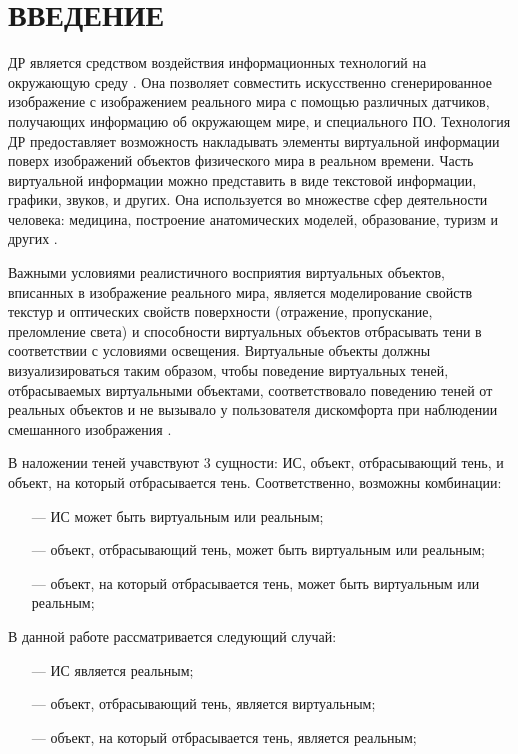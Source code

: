 \chapter*{ВВЕДЕНИЕ}

ДР является средством воздействия информационных технологий на окружающую среду \cite{osti2019real}. Она позволяет совместить искусственно сгенерированное изображение с изображением реального мира с помощью различных датчиков, получающих информацию об окружающем мире, и специального ПО. Технология ДР предоставляет возможность накладывать элементы виртуальной информации поверх изображений объектов физического мира в реальном времени. Часть виртуальной информации можно представить в виде текстовой информации, графики, звуков, и других. Она используется во множестве сфер деятельности человека: медицина, построение анатомических моделей, образование, туризм и других \cite{tech-ar}.

Важными условиями реалистичного восприятия виртуальных объектов, вписанных в изображение реального мира, является моделирование свойств текстур и оптических свойств поверхности (отражение, пропускание, преломление света) и способности виртуальных объектов отбрасывать тени в соответствии с условиями освещения. Виртуальные объекты должны визуализироваться таким образом, чтобы поведение виртуальных теней, отбрасываемых виртуальными объектами, соответствовало поведению теней от реальных объектов и не вызывало у пользователя дискомфорта при наблюдении смешанного изображения \cite{bogdanov}.

В наложении теней учавствуют 3 сущности: ИС, объект, отбрасывающий тень, и объект, на который отбрасывается тень. Соответственно, возможны комбинации:

\begin{itemize}
	\item[---] ИС может быть виртуальным или реальным;
	\item[---] объект, отбрасывающий тень, может быть виртуальным или реальным;
	\item[---] объект, на который отбрасывается тень, может быть виртуальным или реальным;
\end{itemize}

В данной работе рассматривается следующий случай:

\begin{itemize}
	\item[---] ИС является реальным;
	\item[---] объект, отбрасывающий тень, является виртуальным;
	\item[---] объект, на который отбрасывается тень, является реальным;
\end{itemize}

